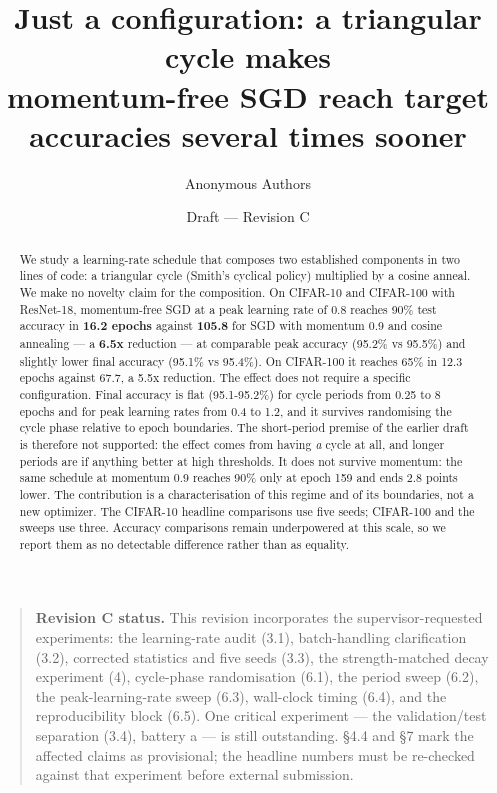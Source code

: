 \documentclass[11pt,a4paper]{article}
\title{Just a configuration: a triangular cycle makes\\[2pt]
momentum-free SGD reach target accuracies several times sooner}
\author{Anonymous Authors}
\date{Draft --- Revision C}
\begin{document}
\maketitle

\begin{quote}
\textbf{Revision C status.} This revision incorporates the supervisor-requested experiments: the learning-rate audit (3.1), batch-handling clarification (3.2), corrected statistics and five seeds (3.3), the strength-matched decay experiment (4), cycle-phase randomisation (6.1), the period sweep (6.2), the peak-learning-rate sweep (6.3), wall-clock timing (6.4), and the reproducibility block (6.5). One critical experiment --- the validation/test separation (3.4), battery a --- is still outstanding. \S{}4.4 and \S{}7 mark the affected claims as provisional; the headline numbers must be re-checked against that experiment before external submission.
\end{quote}

\begin{abstract}
We study a learning-rate schedule that composes two established components in two lines of code: a triangular cycle (Smith's cyclical policy) multiplied by a cosine anneal. We make no novelty claim for the composition. On CIFAR-10 and CIFAR-100 with ResNet-18, momentum-free SGD at a peak learning rate of 0.8 reaches 90\% test accuracy in \textbf{16.2 epochs} against \textbf{105.8} for SGD with momentum 0.9 and cosine annealing --- a \textbf{6.5x} reduction --- at comparable peak accuracy (95.2\% vs 95.5\%) and slightly lower final accuracy (95.1\% vs 95.4\%). On CIFAR-100 it reaches 65\% in 12.3 epochs against 67.7, a 5.5x reduction. The effect does not require a specific configuration. Final accuracy is flat (95.1-95.2\%) for cycle periods from 0.25 to 8 epochs and for peak learning rates from 0.4 to 1.2, and it survives randomising the cycle phase relative to epoch boundaries. The short-period premise of the earlier draft is therefore not supported: the effect comes from having \textit{a} cycle at all, and longer periods are if anything better at high thresholds. It does not survive momentum: the same schedule at momentum 0.9 reaches 90\% only at epoch 159 and ends 2.8 points lower. The contribution is a characterisation of this regime and of its boundaries, not a new optimizer. The CIFAR-10 headline comparisons use five seeds; CIFAR-100 and the sweeps use three. Accuracy comparisons remain underpowered at this scale, so we report them as no detectable difference rather than as equality.

\end{abstract}
\end{document}
